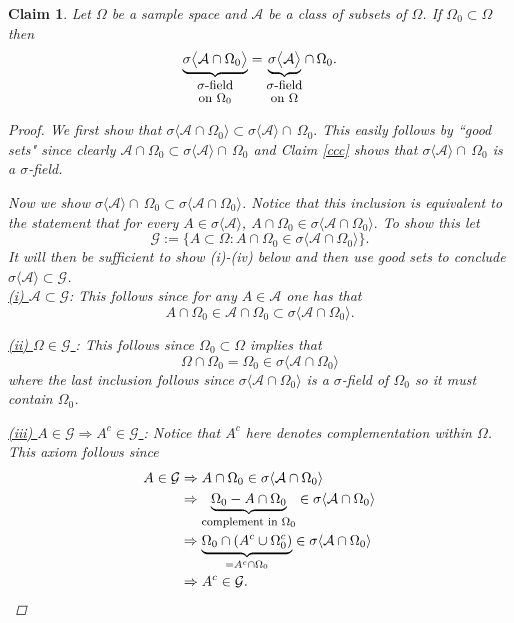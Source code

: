\documentclass[10pt,letterpaper,twocolumn]{article}
\newtheorem{claim}{Claim}
\begin{document}
\begin{claim} 
\label{restricTHM}
Let $\Omega$ be a sample space and  $\mathcal A$ be a class of subsets of $\Omega$.  If $\Omega_0\subset \Omega$ then
\[
\underbrace{\sigma\bigl\langle  \mathcal A \cap \Omega_0 \bigr\rangle}_{\shortstack{ \text{\small $\sigma$-field} \\ \text{\small on $\Omega_0$}}}= \underbrace{\sigma\bigl\langle \mathcal A \bigr\rangle}_{\shortstack{ \text{\small $\sigma$-field} \\ \text{\small on $\Omega$}}} \cap\, \Omega_0.
\]
\begin{proof}
We first show that $\sigma \langle  \mathcal A \cap \Omega_0 \rangle \subset \sigma \langle \mathcal A  \rangle \cap\, \Omega_0.$ This easily follows by ``good sets"  since clearly $\mathcal A\cap \Omega_0\subset \sigma\langle \mathcal A\rangle\cap \,\Omega_0$ and  Claim \ref{ccc} shows that $\sigma \langle \mathcal A  \rangle \cap\, \Omega_0$ is a $\sigma$-field.

Now we show  $\sigma\langle \mathcal A \rangle \cap\, \Omega_0 \subset \sigma \langle  \mathcal A \cap \Omega_0 \rangle $.  Notice that this inclusion is 
equivalent to the statement that for every $A\in \sigma\langle\mathcal A\rangle$, $A\cap \Omega_0\in \sigma\langle\mathcal A\cap \Omega_0\rangle.$  To show this  let 
\[ \mathcal G:=\{ A\subset \Omega: A\cap \Omega_0 \in \sigma\langle \mathcal A \cap \Omega_0 \rangle \}. \]
It will then be sufficient to show (i)-(iv) below and then use good sets to conclude $\sigma\langle\mathcal A \rangle\subset \mathcal G$.
\\
\noindent
\underline{(i)  $\mathcal A\subset \mathcal G$}: This follows since for any $A\in \mathcal A$ one has that 
\[A\cap \Omega_0\in \mathcal A \cap \Omega_0 \subset \sigma\langle \mathcal A \cap \Omega_0 \rangle.  \]
 
  \vspace{.2cm}
\noindent
\underline{(ii) $\Omega \in \mathcal G$ }: This follows since $\Omega_0\subset \Omega$ implies that 
\[\Omega \cap \Omega_0 = \Omega_0 \in \sigma\langle \mathcal A\cap \Omega_0\rangle\]
where the last inclusion follows since $\sigma\langle \mathcal A\cap \Omega_0\rangle$ is a $\sigma$-field of $\Omega_0$ so it must contain $\Omega_0$.

  \vspace{.2cm}
\noindent
\underline{(iii) $A\in \mathcal G\Rightarrow A^c \in \mathcal G$ }: Notice that $A^c$ here denotes complementation within $\Omega$. This axiom follows since 
\begin{align*}
A\in\mathcal G&\Rightarrow A\cap \Omega_0\in \sigma\langle \mathcal A\cap \Omega_0\rangle \\
&\Rightarrow \underbrace{\Omega_0-A\cap \Omega_0}_\text{\footnotesize complement in $\Omega_0$}\in \sigma\langle \mathcal A\cap \Omega_0\rangle \\
&\Rightarrow \underbrace{\Omega_0\cap (A^c\cup \Omega_0^c)}_{= A^c\cap\Omega_0}\in \sigma\langle \mathcal A\cap \Omega_0\rangle \\
&\Rightarrow A^c\in\mathcal G.
\end{align*}



\end{proof}
\end{claim}
\end{document}
